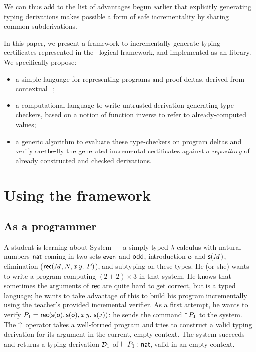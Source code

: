 \documentclass{llncs}
\begin{document}
We can thus add to the list of advantages begun earlier that
explicitly generating typing derivations makes possible a form of safe
incrementality by sharing common subderivations.

In this paper, we present a framework to incrementally generate typing
certificates represented in the \LF\ logical framework, and implemented
as an  library. We specifically propose:
\begin{itemize}
\item a simple language for representing programs and proof
  deltas, derived from contextual \LF\ \cite{nanevski2008contextual};
\item a computational language to write untrusted
  derivation-generating type checkers, based on a notion of function
  inverse
  to refer to already-computed values;
\item a generic algorithm to evaluate these type-checkers on program
  deltas and verify on-the-fly the generated incremental certificates
  against a \emph{repository} of already constructed and checked
  derivations.
\end{itemize}

\section{Using the framework}

\subsection{As a programmer}
\label{sec:use-incremental}

A student is learning about System  --- a simply
typed $\lambda$-calculus with natural numbers $\text{\textsf{nat}}$ coming in
two sets $\text{\textsf{even}}$ and $\text{\textsf{odd}}$, introduction $\text{\textsf{o}}$ and $\text{\textsf{s}} ({M})$,
elimination ($\text{\textsf{rec}}({M},{N},{\text{\textit{x}}}\,{\text{\textit{y}}}.\ {P})$), and subtyping on these types. He (or
she) wants to write a program computing $(2+2)\times 3$ in that
system. He knows that sometimes the arguments of $\text{\textsf{rec}}$ are quite
hard to get correct, but  is a typed language; he
wants to take advantage of this to build his program incrementally
using the teacher's provided incremental verifier. As a first attempt,
he wants to verify $P_1 = \text{\textsf{rec}}({\text{\textsf{s}} ({\text{\textsf{o}}})},{\text{\textsf{s}} ({\text{\textsf{o}}})},{\text{\textit{x}}}\,{\text{\textit{y}}}.\ {\text{\textsf{s}} ({\text{\textit{x}}})})$: he
sends the command $\uparrow\!{P_1}$ to the system. The $\uparrow\!{}$
operator takes a well-formed program and tries to construct a valid
typing derivation for its argument in the current, empty context. The
system succeeds and returns a typing derivation $\mathcal D_1$ of \/ $\vdash
P_1 : \text{\textsf{nat}}$, valid in an empty context.
\end{document}
